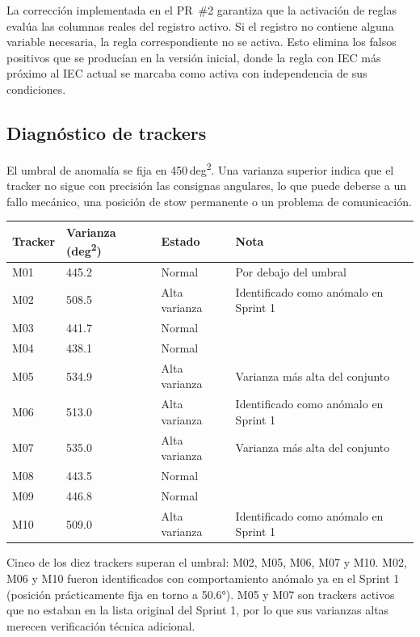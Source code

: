 \documentclass[11pt,a4paper]{article}
\begin{document}
La corrección implementada en el PR~\#2 garantiza que la activación de reglas evalúa las
columnas reales del registro activo. Si el registro no contiene alguna variable necesaria,
la regla correspondiente no se activa. Esto elimina los falsos positivos que se producían
en la versión inicial, donde la regla con IEC más próximo al IEC actual se marcaba como activa
con independencia de sus condiciones.

\subsection{Diagnóstico de trackers}

El umbral de anomalía se fija en 450\,deg\textsuperscript{2}. Una varianza superior indica
que el tracker no sigue con precisión las consignas angulares, lo que puede deberse a un
fallo mecánico, una posición de stow permanente o un problema de comunicación.

\begin{longtable}{p{} p{} p{} p{}}
\toprule
\textbf{Tracker} & \textbf{Varianza (deg\textsuperscript{2})} & \textbf{Estado} & \textbf{Nota} \\
\midrule
M01 & 445.2 & Normal  & Por debajo del umbral \\
M02 & 508.5 & \textcolor{samored}{Alta varianza} & Identificado como anómalo en Sprint 1 \\
M03 & 441.7 & Normal  & \\
M04 & 438.1 & Normal  & \\
M05 & 534.9 & \textcolor{samored}{Alta varianza} & Varianza más alta del conjunto \\
M06 & 513.0 & \textcolor{samored}{Alta varianza} & Identificado como anómalo en Sprint 1 \\
M07 & 535.0 & \textcolor{samored}{Alta varianza} & Varianza más alta del conjunto \\
M08 & 443.5 & Normal  & \\
M09 & 446.8 & Normal  & \\
M10 & 509.0 & \textcolor{samored}{Alta varianza} & Identificado como anómalo en Sprint 1 \\
\bottomrule
\end{longtable}

Cinco de los diez trackers superan el umbral: M02, M05, M06, M07 y M10. M02, M06 y M10
fueron identificados con comportamiento anómalo ya en el Sprint 1 (posición prácticamente
fija en torno a 50.6°). M05 y M07 son trackers activos que no estaban en la lista original
del Sprint 1, por lo que sus varianzas altas merecen verificación técnica adicional.
\end{document}
